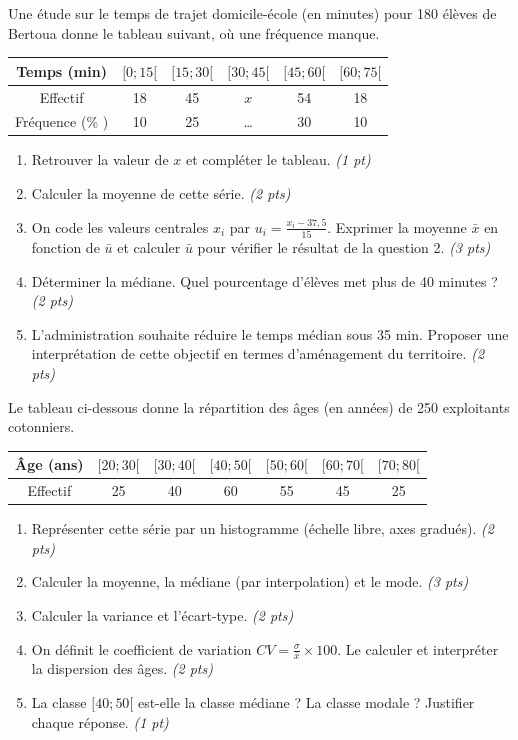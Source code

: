 \documentclass[11pt]{article}
\begin{document}
\begin{exercice}
Une étude sur le temps de trajet domicile-école (en minutes) pour 180 élèves de Bertoua donne le tableau suivant, où une fréquence manque.
\begin{center}
\begin{tabular}{|c|c|c|c|c|c|}
\hline
Temps (min) & $[0; 15[$ & $[15; 30[$ & $[30; 45[$ & $[45; 60[$ & $[60; 75[$ \\
\hline
Effectif & 18 & 45 & $x$ & 54 & 18 \\
\hline
Fréquence (\% ) & 10 & 25 & \dots & 30 & 10 \\
\hline
\end{tabular}
\end{center}
\begin{enumerate}
    \item Retrouver la valeur de $x$ et compléter le tableau. \textit{(1 pt)}
    \item Calculer la moyenne de cette série. \textit{(2 pts)}
    \item On code les valeurs centrales $x_i$ par $u_i = \frac{x_i - 37,5}{15}$. Exprimer la moyenne $\bar{x}$ en fonction de $\bar{u}$ et calculer $\bar{u}$ pour vérifier le résultat de la question 2. \textit{(3 pts)}
    \item Déterminer la médiane. Quel pourcentage d'élèves met plus de 40 minutes ? \textit{(2 pts)}
    \item L'administration souhaite réduire le temps médian sous 35 min. Proposer une interprétation de cette objectif en termes d'aménagement du territoire. \textit{(2 pts)}
\end{enumerate}
\end{exercice}

\begin{exercice}
Le tableau ci-dessous donne la répartition des âges (en années) de 250 exploitants cotonniers.
\begin{center}
\begin{tabular}{|c|c|c|c|c|c|c|}
\hline
Âge (ans) & $[20; 30[$ & $[30; 40[$ & $[40; 50[$ & $[50; 60[$ & $[60; 70[$ & $[70; 80[$ \\
\hline
Effectif & 25 & 40 & 60 & 55 & 45 & 25 \\
\hline
\end{tabular}
\end{center}
\begin{enumerate}
    \item Représenter cette série par un histogramme (échelle libre, axes gradués). \textit{(2 pts)}
    \item Calculer la moyenne, la médiane (par interpolation) et le mode. \textit{(3 pts)}
    \item Calculer la variance et l'écart-type. \textit{(2 pts)}
    \item On définit le coefficient de variation $CV = \frac{\sigma}{\bar{x}} \times 100$. Le calculer et interpréter la dispersion des âges. \textit{(2 pts)}
    \item La classe $[40; 50[$ est-elle la classe médiane ? La classe modale ? Justifier chaque réponse. \textit{(1 pt)}
\end{enumerate}
\end{exercice}
\end{document}
